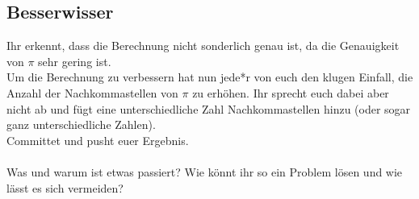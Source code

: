 \subsection{Besserwisser}
Ihr erkennt, dass die Berechnung nicht sonderlich genau ist, da die Genauigkeit von $\pi$ sehr gering ist.\\
Um die Berechnung zu verbessern hat nun jede*r von euch den klugen Einfall, die Anzahl der Nachkommastellen von $\pi$ zu erhöhen. Ihr sprecht euch dabei aber nicht ab und fügt eine unterschiedliche Zahl Nachkommastellen hinzu (oder sogar ganz unterschiedliche Zahlen).\\
Committet und pusht euer Ergebnis.\\\\
Was und warum ist etwas passiert? Wie könnt ihr so ein Problem lösen und wie lässt es sich vermeiden?
